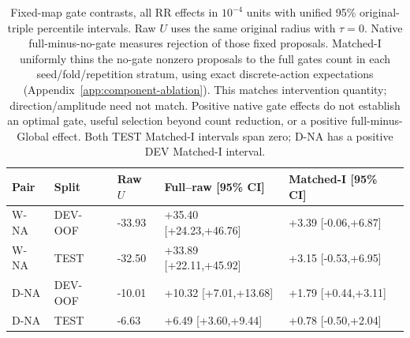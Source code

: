 \begin{table}[htbp]
\centering\footnotesize\setlength{\tabcolsep}{3pt}
\caption{Fixed-map gate contrasts, all RR effects in $10^{-4}$ units with unified 95\% original-triple percentile intervals. Raw $U$ uses the same original radius with $\tau=0$. Native full-minus-no-gate measures rejection of those fixed proposals. Matched-I uniformly thins the no-gate nonzero proposals to the full gate\textquotesingle s count in each seed/fold/repetition stratum, using exact discrete-action expectations (Appendix~\ref{app:component-ablation}). This matches intervention quantity; direction/amplitude need not match. Positive native gate effects do not establish an optimal gate, useful selection beyond count reduction, or a positive full-minus-Global effect. Both TEST Matched-I intervals span zero; D-NA has a positive DEV Matched-I interval.}
\label{tab:scope-gate}
\begin{tabular}{lll ll}
\toprule
Pair & Split & Raw $U$ & Full--raw [95\% CI] & Matched-I [95\% CI]\\
\midrule
W-NA & DEV-OOF & -33.93 & +35.40 [+24.23,+46.76] & +3.39 [-0.06,+6.87]\\
W-NA & TEST & -32.50 & +33.89 [+22.11,+45.92] & +3.15 [-0.53,+6.95]\\
D-NA & DEV-OOF & -10.01 & +10.32 [+7.01,+13.68] & +1.79 [+0.44,+3.11]\\
D-NA & TEST & -6.63 & +6.49 [+3.60,+9.44] & +0.78 [-0.50,+2.04]\\
\bottomrule
\end{tabular}
\end{table}

